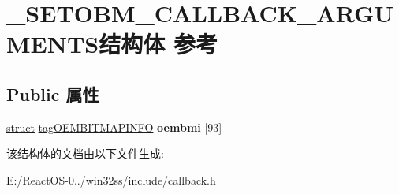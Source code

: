 \hypertarget{struct___s_e_t_o_b_m___c_a_l_l_b_a_c_k___a_r_g_u_m_e_n_t_s}{}\section{\+\_\+\+S\+E\+T\+O\+B\+M\+\_\+\+C\+A\+L\+L\+B\+A\+C\+K\+\_\+\+A\+R\+G\+U\+M\+E\+N\+T\+S结构体 参考}
\label{struct___s_e_t_o_b_m___c_a_l_l_b_a_c_k___a_r_g_u_m_e_n_t_s}
\subsection*{Public 属性}
\begin{DoxyCompactItemize}
\item 
\mbox{\label{struct___s_e_t_o_b_m___c_a_l_l_b_a_c_k___a_r_g_u_m_e_n_t_s_a65635bcb889e57a54329e3418a2433a0}} 
\hyperlink{interfacestruct}{struct} \hyperlink{structtag_o_e_m_b_i_t_m_a_p_i_n_f_o}{tag\+O\+E\+M\+B\+I\+T\+M\+A\+P\+I\+N\+FO} {\bfseries oembmi} \mbox{[}93\mbox{]}
\end{DoxyCompactItemize}


该结构体的文档由以下文件生成\+:\begin{DoxyCompactItemize}
\item 
E\+:/\+React\+O\+S-\/0../win32ss/include/callback.\+h\end{DoxyCompactItemize}
